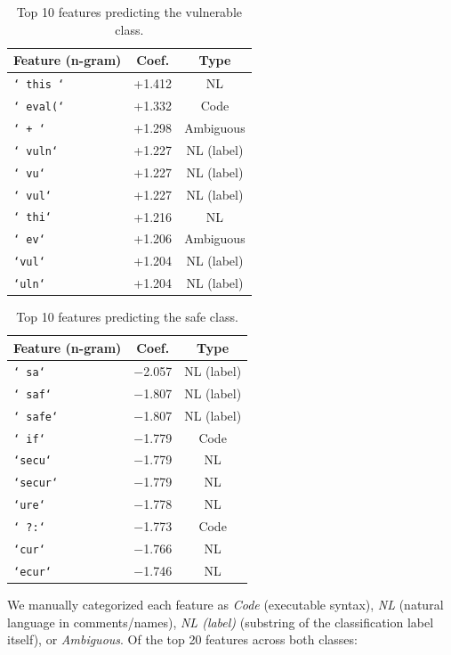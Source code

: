 \documentclass[11pt,a4paper]{article}
\begin{document}
\begin{table}[H]
\centering
\caption{Top 10 features predicting the vulnerable class.}
\label{tab:vuln_features}
\begin{tabular}{lcc}
\toprule
\textbf{Feature (n-gram)} & \textbf{Coef.} & \textbf{Type} \\
\midrule
\texttt{` this `} & +1.412 & NL \\
\texttt{` eval(`} & +1.332 & Code \\
\texttt{` + `} & +1.298 & Ambiguous \\
\texttt{` vuln`} & +1.227 & NL (label) \\
\texttt{` vu`} & +1.227 & NL (label) \\
\texttt{` vul`} & +1.227 & NL (label) \\
\texttt{` thi`} & +1.216 & NL \\
\texttt{` ev`} & +1.206 & Ambiguous \\
\texttt{`vul`} & +1.204 & NL (label) \\
\texttt{`uln`} & +1.204 & NL (label) \\
\bottomrule
\end{tabular}
\end{table}

\begin{table}[H]
\centering
\caption{Top 10 features predicting the safe class.}
\label{tab:safe_features}
\begin{tabular}{lcc}
\toprule
\textbf{Feature (n-gram)} & \textbf{Coef.} & \textbf{Type} \\
\midrule
\texttt{` sa`} & $-$2.057 & NL (label) \\
\texttt{` saf`} & $-$1.807 & NL (label) \\
\texttt{` safe`} & $-$1.807 & NL (label) \\
\texttt{` if`} & $-$1.779 & Code \\
\texttt{`secu`} & $-$1.779 & NL \\
\texttt{`secur`} & $-$1.779 & NL \\
\texttt{`ure`} & $-$1.778 & NL \\
\texttt{` ?:`} & $-$1.773 & Code \\
\texttt{`cur`} & $-$1.766 & NL \\
\texttt{`ecur`} & $-$1.746 & NL \\
\bottomrule
\end{tabular}
\end{table}

We manually categorized each feature as \textit{Code} (executable syntax), \textit{NL} (natural language in comments/names), \textit{NL (label)} (substring of the classification label itself), or \textit{Ambiguous}. Of the top 20 features across both classes:
\end{document}
